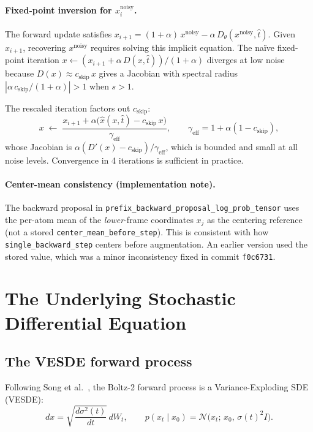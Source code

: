 \documentclass[11pt,a4paper]{article}
\newcommand{\N}{\mathcal{N}}
\newcommand{\xnoisy}{x^{\mathrm{noisy}}}
\newcommand{\xhat}{\hat{x}}
\newcommand{\that}{\hat{t}}
\newcommand{\Dtheta}{D_\theta}
\newcommand{\cskip}{c_{\mathrm{skip}}}
\begin{document}
\paragraph{Fixed-point inversion for $\xnoisy_i$.}
The forward update satisfies
$x_{i+1} = (1+\alpha)\,\xnoisy - \alpha\,\Dtheta(\xnoisy, \that)$.
Given $x_{i+1}$, recovering $\xnoisy$ requires solving this implicit
equation.  The na\"ive fixed-point iteration
$x \leftarrow (x_{i+1} + \alpha\,D(x,\that))/(1+\alpha)$
diverges at low noise because $D(x) \approx \cskip\,x$ gives a
Jacobian with spectral radius $|\alpha\,\cskip/(1+\alpha)| > 1$ when $s > 1$.

The rescaled iteration factors out $\cskip$:
\begin{equation}
  x \;\leftarrow\; \frac{x_{i+1} + \alpha\bigl(\xhat(x,\that) - \cskip\,x\bigr)}
                        {\gamma_{\mathrm{eff}}}, \qquad
  \gamma_{\mathrm{eff}} = 1 + \alpha(1 - \cskip),
  \label{eq:fp-inversion}
\end{equation}
whose Jacobian is $\alpha(D'(x) - \cskip)/\gamma_{\mathrm{eff}}$,
which is bounded and small at all noise levels.  Convergence in 4
iterations is sufficient in practice.

\paragraph{Center-mean consistency (implementation note).}
The backward proposal in \texttt{prefix\_backward\_proposal\_log\_prob\_tensor}
uses the per-atom mean of the \emph{lower}-frame coordinates $x_j$ as the
centering reference (not a stored \texttt{center\_mean\_before\_step}).
This is consistent with how \texttt{single\_backward\_step} centers before
augmentation.  An earlier version used the stored value, which was a minor
inconsistency fixed in commit \texttt{f0c6731}.

\section{The Underlying Stochastic Differential Equation}
\label{sec:sde}

\subsection{The VESDE forward process}

Following Song et al.~\cite{song2021sde}, the Boltz-2 forward process
is a Variance-Exploding SDE (VESDE):
\begin{equation}
  dx = \sqrt{\frac{d\sigma^2(t)}{dt}}\,dW_t,
  \qquad
  p(x_t \mid x_0) = \N\bigl(x_t;\, x_0,\, \sigma(t)^2 I\bigr).
  \label{eq:vesde-forward}
\end{equation}
\end{document}
